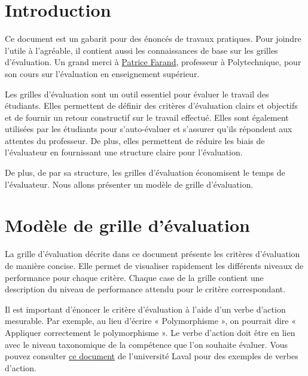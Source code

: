\documentclass[letterpaper, 12pt]{article}
\begin{document}
\newpage

\setcounter{page}{2}
\pagestyle{fancy}
\fancyhf{}
\cfoot{\thepage}


\section{Introduction}

Ce document est un gabarit pour des énoncés de travaux pratiques. Pour joindre
l'utile à l'agréable, il contient aussi les connaissances de base sur les
grilles d'évaluation. Un grand merci à \href{https://www.polymtl.ca/expertises/farand-patrice}
{Patrice Farand}, professeur à Polytechnique, pour son cours sur l'évaluation
en enseignement supérieur.

Les grilles d'évaluation sont un outil essentiel pour évaluer le travail des
étudiants. Elles permettent de définir des critères d'évaluation clairs et
objectifs et de fournir un retour constructif sur le travail effectué. Elles
sont également utilisées par les étudiants pour s'auto-évaluer et s'assurer
qu'ils répondent aux attentes du professeur. De plus, elles permettent de
réduire les biais de l'évaluateur en fournissant une structure claire pour
l'évaluation.

De plus, de par sa structure, les grilles d'évaluation économisent le temps de
l'évaluateur. Nous allons présenter un modèle de grille d'évaluation.

\section{Modèle de grille d'évaluation}

La grille d'évaluation décrite dans ce document présente les critères
d'évaluation de manière concise. Elle permet de visualiser rapidement les
différents niveaux de performance pour chaque critère. Chaque case de la grille
contient une description du niveau de performance attendu pour le critère
correspondant.

Il est important d'énoncer le critère d'évaluation à l'aide d'un verbe d'action
mesurable. Par exemple, au lieu d'écrire « Polymorphisme », on
pourrait dire « Appliquer correctement le polymorphisme ». Le verbe d'action
doit être en lien avec le niveau taxonomique de la compétence que l'on souhaite
évaluer. Vous pouvez consulter 
\href{https://www.enseigner.ulaval.ca/system/files/public/pedagogie/preparer-votre-cours/taxonomie-de-bloom-revisee.pdf}
{ce document} de l'université Laval pour des exemples de verbes d'action.
\end{document}
